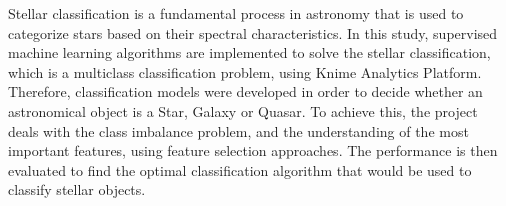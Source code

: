 Stellar classification is a fundamental process in astronomy that is used to categorize stars based on their spectral characteristics. In this study, %
supervised machine learning algorithms are implemented to solve the stellar classification, which is a multiclass classification problem, using Knime Analytics Platform. Therefore, classification models were developed in order to decide whether an astronomical object is a Star, Galaxy or Quasar. To achieve this, the project deals with the class imbalance problem, and the understanding of the most important features, using feature selection approaches. The performance is then evaluated to find the optimal classification algorithm that would be used to classify stellar objects.